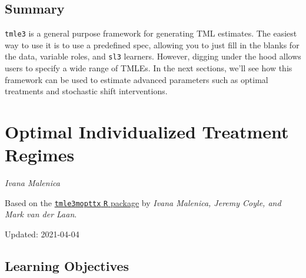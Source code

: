 \documentclass[12pt, krantz2,]{book}
\theoremstyle{definition}
\theoremstyle{definition}
\theoremstyle{definition}
\newcommand{\1}{\mathbbm{1}}
\begin{document}
\hypertarget{summary}{%
\section{Summary}\label{summary}}

\texttt{tmle3} is a general purpose framework for generating TML estimates. The easiest
way to use it is to use a predefined spec, allowing you to just fill in the
blanks for the data, variable roles, and \texttt{sl3} learners. However, digging under
the hood allows users to specify a wide range of TMLEs. In the next sections,
we'll see how this framework can be used to estimate advanced parameters such as
optimal treatments and stochastic shift interventions.

\hypertarget{optimal-individualized-treatment-regimes}{%
\chapter{Optimal Individualized Treatment Regimes}\label{optimal-individualized-treatment-regimes}}

\emph{Ivana Malenica}

Based on the \href{https://github.com/tlverse/tmle3mopttx}{\texttt{tmle3mopttx} \texttt{R} package}
by \emph{Ivana Malenica, Jeremy Coyle, and Mark van der Laan}.

Updated: 2021-04-04

\hypertarget{learning-objectives-4}{%
\section{Learning Objectives}\label{learning-objectives-4}}
\end{document}
